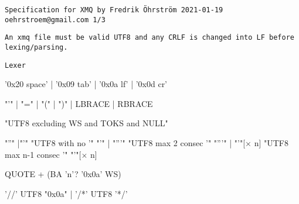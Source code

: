 \documentclass[10pt,a4paper]{article}
\begin{document}
\texttt{Specification for XMQ by Fredrik Öhrström 2021-01-19 \texttt{oehrstroem@gmail.com} \hfill 1/3}

\vspace{2mm}

\texttt{An xmq file must be valid UTF8 and any CRLF is changed into LF before lexing/parsing.}

\vspace{2mm}

\texttt{Lexer}

\vspace{2mm}

\raisebox{32pt}{WS:}
\begin{minipage}{15cm}
\begin{rail}
'0x20 space' | '0x09 tab' | '0x0a lf' | '0x0d cr'
\end{rail}
\end{minipage}

\raisebox{55pt}{TOKS:}
\begin{minipage}{15cm}
\begin{rail}
"'" | "=" | "(" | ")" | LBRACE | RBRACE
\end{rail}
\end{minipage}

\raisebox{-4pt}{TEXT:}
\begin{minipage}{15cm}
\begin{rail}
"UTF8 excluding WS and TOKS and NULL"
\end{rail}
\end{minipage}

\raisebox{32pt}{QUOTE:}
\begin{minipage}{15cm}
\begin{rail}
  "''"
  |"'" "UTF8 with no '" "'"
  | "'''" "UTF8 max 2 consec '" "'''"
  | "'"[$\times$ n] "UTF8 max n-1 consec '" "'"[$\times$ n]
\end{rail}
\end{minipage}

\raisebox{20pt}{QUOTES:}
\begin{minipage}{15cm}
  \begin{rail}
  QUOTE + (BA 'n'? '0x0a' WS)
\end{rail}
\end{minipage}

\raisebox{8pt}{COMMENT:}
\begin{minipage}{15cm}
\begin{rail}
  '//' UTF8 "0x0a"
  | '/*' UTF8 '*/'
\end{rail}
\end{minipage}
\end{document}
